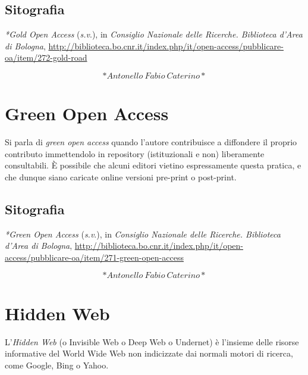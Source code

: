 \documentclass[
  b5paper,
  twoside,
  12pt,
  chapterprefix=false,
  bibliography=totocnumbered,
  parskip=false]{scrbook}
\begin{document}
\hypertarget{sitografia-14}{%
\section*{Sitografia}\label{sitografia-14}}

\emph{*Gold Open Access} (\emph{s.v}.), in \emph{Consiglio Nazionale delle Ricerche.
Biblioteca d'Area di Bologna},
\url{http://biblioteca.bo.cnr.it/index.php/it/open-access/pubblicare-oa/item/272-gold-road}

\[*Antonello~Fabio~Caterino*\]

\hypertarget{green-open-access}{%
\chapter{Green Open Access}\label{green-open-access}}

Si parla di \emph{green open access} quando l'autore contribuisce a
diffondere il proprio contributo immettendolo in repository
(istituzionali e non) liberamente consultabili. È possibile che alcuni
editori vietino espressamente questa pratica, e che dunque siano
caricate online versioni pre-print o post-print.

\hypertarget{sitografia-15}{%
\section*{Sitografia}\label{sitografia-15}}

\emph{*Green Open Access} (\emph{s.v}.), in \emph{Consiglio Nazionale delle Ricerche.
Biblioteca d'Area di Bologna},
\url{http://biblioteca.bo.cnr.it/index.php/it/open-access/pubblicare-oa/item/271-green-open-access}

\[*Antonello~Fabio~Caterino*\]

\hypertarget{hidden-web}{%
\chapter{Hidden Web}\label{hidden-web}}

L'\emph{Hidden Web} (o Invisible Web o Deep Web o Undernet) è l'insieme delle
risorse informative del World Wide Web non indicizzate dai normali
motori di ricerca, come Google, Bing o Yahoo.
\end{document}

